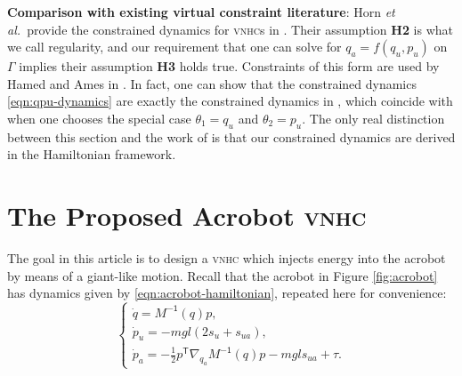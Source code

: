 \documentclass[journal,twoside,web, twocolumn]{ieeecolor}
\newtheorem{defn}{Definition} %
\newcommand*{\tpose}{^\mathsf{T}}
\newcommand*{\Minv}{M^\mathsf{-1}}
\newcommand*{\etal}{\MakeLowercase{\textit{et al.~}}}
\newcommand*{\vnhc}{\textsc{vnhc}\xspace}
\newcommand*{\vnhcs}{\textsc{vnhc}s\xspace}
\begin{document}


\textbf{Comparison with existing virtual constraint literature}: Horn \etal provide the constrained
dynamics for \vnhcs in \cite{nhvc_incline_walking}.
Their assumption \textbf{H2} is what we call regularity, and our requirement
that one can solve for \(q_a = f(q_u,p_u)\) on \(\Gamma\) implies their
assumption \textbf{H3} holds true.
Constraints of this form are used by Hamed and Ames in
\cite{nonholonomic_hybrid_zero_dynamics}.
In fact, one can show that the constrained dynamics \eqref{eqn:qpu-dynamics}
are exactly the constrained dynamics in
\cite[Eqn. (9)]{nonholonomic_hybrid_zero_dynamics}, which coincide with 
\cite[Eqn. (17)]{hybrid_zero_dynamics_bipedal_nhvcs}
when one chooses the special case \(\theta_1 = q_u\) and 
\(\theta_2 = p_u\).
The only real distinction between this section and the work of
\cite{nonholonomic_hybrid_zero_dynamics,hybrid_zero_dynamics_bipedal_nhvcs} is
that our constrained dynamics are derived in the Hamiltonian framework. 

\section{The Proposed Acrobot \vnhc}\label{sec:acrobot}

The goal in this article is to design a \vnhc which injects energy into the
acrobot by means of a giant-like motion.
Recall that the acrobot in Figure \ref{fig:acrobot} has dynamics given by
\eqref{eqn:acrobot-hamiltonian}, repeated here for convenience:
    \begin{equation*}
     \begin{cases}
        \dot{q} = \Minv(q) p 
        ,\\
        \dot{p}_u = -mgl\left(2s_u + s_{ua}\right) 
        ,\\
        \dot{p}_a =-\frac{1}{2}p\tpose \nabla_{q_a}\Minv(q) p
        - mgl s_{ua} + \tau.
    \end{cases}
\end{equation*}
\end{document}
